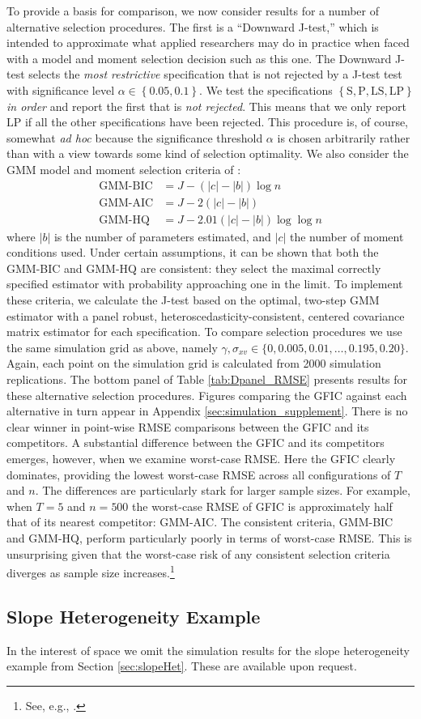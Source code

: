 To provide a basis for comparison, we now consider results for a number of alternative selection procedures. 
The first is a ``Downward J-test,'' which is intended to approximate what applied researchers may do in practice when faced with a model and moment selection decision such as this one.
The Downward J-test selects the \emph{most restrictive} specification that is not rejected by a J-test test with significance level $\alpha \in \left\{ 0.05, 0.1 \right\}$.
We test the specifications $\left\{\text{S}, \text{P}, \text{LS}, \text{LP}\right\}$ \emph{in order} and report the first that is \emph{not rejected}.
This means that we only report $\text{LP}$ if all the other specifications have been rejected.
This procedure is, of course, somewhat \emph{ad hoc} because the significance threshold $\alpha$ is chosen arbitrarily rather than with a view towards some kind of selection optimality. 
We also consider the GMM model and moment selection criteria of \cite{AndrewsLu}: 
	\begin{align*}
	 \mbox{GMM-BIC} &= J - (|c| - |b|) \log{n}\\
	 \mbox{GMM-AIC}&= J - 2(|c| - |b|)\\ 
	 \mbox{GMM-HQ} &= J - 2.01 (|c| - |b|)  \log{\log{n}}
	\end{align*}
where $|b|$ is the number of parameters estimated, and $|c|$ the number of moment conditions used. 
Under certain assumptions, it can be shown that both the GMM-BIC and GMM-HQ are consistent: they select the maximal correctly specified estimator with probability approaching one in the limit. 
To implement these criteria, we calculate the J-test based on the optimal, two-step GMM estimator with a panel robust, heteroscedasticity-consistent, centered covariance matrix estimator for each specification.
To compare selection procedures we use the same simulation grid as above, namely $\gamma, \sigma_{xv} \in \{0, 0.005, 0.01, \hdots, 0.195, 0.20\}$.  
Again, each point on the simulation grid is calculated from 2000 simulation replications. 
The bottom panel of Table \ref{tab:Dpanel_RMSE} presents results for these alternative selection procedures.
Figures comparing the GFIC against each alternative in turn appear in Appendix \ref{sec:simulation_supplement}.
There is no clear winner in point-wise RMSE comparisons between the GFIC and its competitors. 
A substantial difference between the GFIC and its competitors emerges, however, when we examine worst-case RMSE.
Here the GFIC clearly dominates, providing the lowest worst-case RMSE across all configurations of $T$ and $n$.
The differences are particularly stark for larger sample sizes.
For example, when $T=5$ and $n=500$ the worst-case RMSE of GFIC is approximately half that of its nearest competitor: GMM-AIC.
The consistent criteria, GMM-BIC and GMM-HQ, perform particularly poorly in terms of worst-case RMSE.
This is unsurprising given that the worst-case risk of any consistent selection criteria diverges as sample size increases.\footnote{See, e.g., \cite{LeebPoetscher2008}.}

\subsection{Slope Heterogeneity Example}
In the interest of space we omit the simulation results for the slope heterogeneity example from Section \ref{sec:slopeHet}.
These are available upon request.
